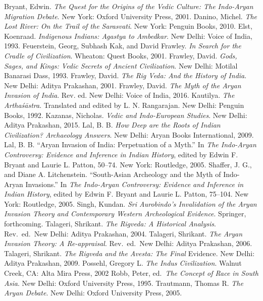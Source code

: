 \begin{thebibliography}{99}
 Bryant, Edwin. \textit{The Quest for the Origins of the Vedic Culture: The Indo-Aryan Migration Debate}. New York: Oxford University Press, 2001.
 Danino, Michel. \textit{The Lost River: On the Trail of the Sarasvati}. New York: Penguin Books, 2010.
 Elst, Koenraad. \textit{Indigenous Indians: Agastya to Ambedkar}. New Delhi: Voice of India, 1993.
 Feuerstein, Georg, Subhash Kak, and David Frawley. \textit{In Search for the Cradle of Civilization}. Wheaton: Quest Books, 2001.
 Frawley, David. \textit{Gods, Sages, and Kings: Vedic Secrets of Ancient Civilization}. New Delhi: Motilal Banarasi Dass, 1993.
 Frawley, David. \textit{The Rig Veda: And the History of India}. New Delhi: Aditya Prakashan, 2001. 
 Frawley, David. \textit{The Myth of the Aryan Invasion of India}. Rev. ed. New Delhi: Voice of India, 2016.
 Kautilya. \textit{The Arthaśāstra}. Translated and edited by L. N. Rangarajan. New Delhi: Penguin Books, 1992.
 Kazanas, Nicholas. \textit{Vedic and Indo-European Studies}. New Delhi: Aditya Prakashan, 2015.
 Lal, B. B. \textit{How Deep are the Roots of Indian Civilization? Archaeology Answers}. New Delhi: Aryan Books International, 2009.
 Lal, B. B. “Aryan Invasion of India: Perpetuation of a Myth.” In \textit{The Indo-Aryan Controversy: Evidence and Inference in Indian History}, edited by Edwin F. Bryant and Laurie L. Patton, 50--74. New York: Routledge, 2005.
 Shaffer, J. G., and Diane A. Litchenstein. “South-Asian Archeology and the Myth of Indo-Aryan Invasions.” In \textit{The Indo-Aryan Controversy: Evidence and Inference in Indian History}, edited by Edwin F. Bryant and Laurie L. Patton, 75--104. New York: Routledge, 2005.
 Singh, Kundan. \textit{Sri Aurobindo’s Invalidation of the Aryan Invasion Theory and Contemporary Western Archeological Evidence}. Springer, forthcoming. 
 Talageri, Shrikant. \textit{The Rigveda: A Historical Analysis}. Rev.\ ed.\ New Delhi: Aditya Prakashan, 2004. 
 Talageri, Shrikant. \textit{The Aryan Invasion Theory: A Re-appraisal}. Rev.\ ed.\ New Delhi: Aditya Prakashan, 2006.
 Talageri, Shrikant. \textit{The Rigveda and the Avesta: The Final} Evidence. New Delhi: Aditya Prakashan, 2009.
 Possehl, Gregory L. \textit{The Indus Civilization}. Walnut Creek, CA: Alta Mira Press, 2002
 Robb, Peter, ed.\ \textit{The Concept of Race in South Asia}. New Delhi: Oxford University Press, 1995. 
 Trautmann, Thomas R. \textit{The Aryan Debate}. New Delhi: Oxford University Press, 2005.
\end{thebibliography}
\newpage

